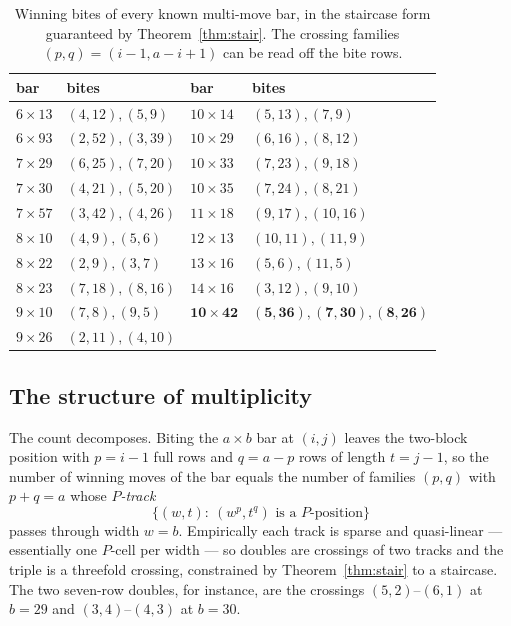 \documentclass[11pt]{article}
\theoremstyle{definition}
\begin{document}
\begin{table}[h]\centering
\caption{Winning bites of every known multi-move bar, in the staircase form
guaranteed by Theorem~\ref{thm:stair}. The crossing families
$(p,q)=(i{-}1,a{-}i{+}1)$ can be read off the bite rows.}\label{tab:bites}
\begin{tabular}{llll}
\toprule
bar & bites & bar & bites\\
\midrule
$6\times13$ & $(4,12),(5,9)$ & $10\times14$ & $(5,13),(7,9)$\\
$6\times93$ & $(2,52),(3,39)$ & $10\times29$ & $(6,16),(8,12)$\\
$7\times29$ & $(6,25),(7,20)$ & $10\times33$ & $(7,23),(9,18)$\\
$7\times30$ & $(4,21),(5,20)$ & $10\times35$ & $(7,24),(8,21)$\\
$7\times57$ & $(3,42),(4,26)$ & $11\times18$ & $(9,17),(10,16)$\\
$8\times10$ & $(4,9),(5,6)$ & $12\times13$ & $(10,11),(11,9)$\\
$8\times22$ & $(2,9),(3,7)$ & $13\times16$ & $(5,6),(11,5)$\\
$8\times23$ & $(7,18),(8,16)$ & $14\times16$ & $(3,12),(9,10)$\\
$9\times10$ & $(7,8),(9,5)$ & $\mathbf{10\times42}$ &
  $\mathbf{(5,36),(7,30),(8,26)}$\\
$9\times26$ & $(2,11),(4,10)$ & & \\
\bottomrule
\end{tabular}
\end{table}

\subsection{The structure of multiplicity}\label{sec:chomptracks}

The count decomposes. Biting the $a\times b$ bar at $(i,j)$ leaves the
two-block position with $p=i-1$ full rows and $q=a-p$ rows of length $t=j-1$,
so the number of winning moves of the bar equals the number of families
$(p,q)$ with $p+q=a$ whose \emph{$P$-track}
\[
  \{(w,t):\ (w^p,t^q)\text{ is a }P\text{-position}\}
\]
passes through width $w=b$. Empirically each track is sparse and quasi-linear
--- essentially one $P$-cell per width --- so doubles are crossings of two
tracks and the triple is a threefold crossing, constrained by
Theorem~\ref{thm:stair} to a staircase. The two seven-row doubles, for
instance, are the crossings $(5,2)$--$(6,1)$ at $b=29$ and $(3,4)$--$(4,3)$ at
$b=30$.
\end{document}
